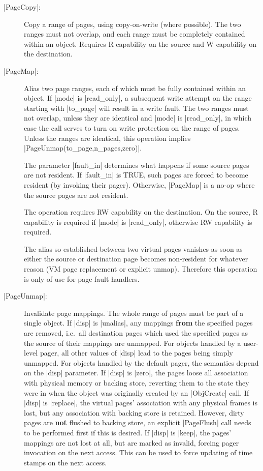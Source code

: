 \documentclass[a4paper,11pt,twoside,dvips]{report}
\begin{document}
\begin{description}
\item[|PageCopy|:] Copy a range of pages, using copy-on-write (where
possible). The two ranges must not overlap, and each range must be
completely contained within an object. Requires R capability on
the source and W capability on the destination.

\item[|PageMap|:] Alias two page ranges, each of which must be fully
contained within an object. If |mode| is |read\_only|, a subsequent
write attempt on the range starting with |to\_page| will result in a
write fault.  The two ranges must not overlap, unless they are identical
and |mode| is |read\_only|, in which case the call serves to turn on
write protection on the range of pages. Unless the ranges are identical,
this operation implies |PageUnmap(to\_page,n\_pages,zero)|.

The parameter |fault\_in| determines what happens if some source pages
are not resident. If |fault\_in| is TRUE, such pages are forced to
become resident (by invoking their pager). Otherwise, |PageMap| is a
no-op where the source pages are not resident.

The operation requires RW capability on the destination. On the source,
R capability is required if |mode| is |read\_only|, otherwise RW
capability is required.

The alias so established between two virtual pages vanishes as soon as
either the source or destination page becomes non-resident for whatever
reason (VM page replacement or explicit unmap). Therefore this operation
is only of use for page fault handlers.

\item[|PageUnmap|:] Invalidate page mappings. The whole range of pages
must be part of a single object. If |disp| is |unalias|, any mappings
\textbf{from} the specified pages are removed, i.e.\ all destination
pages which used the specified pages as the source of their mappings are
unmapped.  For objects handled by a user-level pager, all other values
of |disp| lead to the pages being simply unmapped. For objects handled
by the default pager, the semantics depend on the |disp| parameter. If
|disp| is |zero|, the pages loose all association with physical memory
or backing store, reverting them to the state they were in when the
object was originally created by an |ObjCreate| call. If |disp| is
|replace|, the virtual pages' association with any physical frames is
lost, but any association with backing store is retained. However, dirty
pages are \textbf{not} flushed to backing store, an explicit |PageFlush|
call needs to be performed first if this is desired. If |disp| is
|keep|, the pages' mappings are not lost at all, but are marked as
invalid, forcing pager invocation on the next access. This can be used
to force updating of time stamps on the next access.


\end{description}
\end{document}
